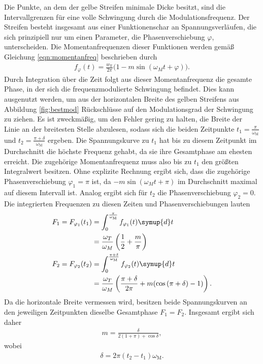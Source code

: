Die Punkte, an dem der gelbe Streifen minimale Dicke besitzt, sind die
Intervallgrenzen für eine volle Schwingung durch die Modulationsfrequenz. Der Streifen besteht insgesamt aus
einer Funktionenschar an Spannungsverläufen, die sich prinzipiell nur um einen Parameter, die Phasenverschiebung $\varphi$,
unterscheiden. Die Momentanfrequenzen dieser Funktionen werden gemäß Gleichung \eqref{eqn:momentanfreq} beschrieben durch
\begin{align}
  f_{\varphi}(t) = \frac{w_\text{T}}{2 \pi} \bigl(1 - m \sin{(\omega_M t + \varphi)}\bigr).
\end{align}
Durch Integration über die Zeit folgt aus dieser Momentanfrequenz die gesamte Phase, in der sich die frequenzmodulierte
Schwingung befindet. Dies kann ausgenutzt werden, um aus der horizontalen Breite des gelben Streifens aus Abbildung \ref{fig:bestmod}
Rückschlüsse auf den Modulationsgrad der Schwingung zu ziehen. Es ist zweckmäßig, um den Fehler gering zu halten,
die Breite der Linie an der breitesten Stelle abzulesen, sodass sich die beiden Zeitpunkte $t_1 = \frac{\pi}{\omega_\text{M}}$
und $t_2 = \frac{\pi + \delta}{\omega_\text{M}}$ ergeben. Die Spannungskurve zu $t_1$ hat bis zu diesem
Zeitpunkt im Durchschnitt die höchste Frequenz gehabt, da sie ihre Gesamtphase am ehesten erreicht. Die zugehörige Momentanfrequenz
muss also bis zu $t_1$ den größten Integralwert besitzen. Ohne explizite Rechnung ergibt sich, dass die zugehörige
Phasenverschiebung $\varphi_1 = \pi$ ist, da $-m\sin{(\omega_M t + \pi)}$ im Durchschnitt maximal auf diesem Intervall ist.
Analog ergibt sich für $t_2$ die Phasenverschiebung $\varphi_2 = 0$. Die integrierten Frequenzen zu diesen Zeiten und Phasenverschiebungen lauten
\begin{align}
  F_1 = F_{\varphi_1}(t_1) &= \int_{0}^{\frac{\pi}{\omega_\text{M}}} f_{\varphi_1}(t) \symup{d}t \\
  &= \frac{\omega_T}{\omega_M} \left( \frac12 + \frac{m}{\pi} \right) \\
  F_2 = F_{\varphi_2}(t_2) &= \int_{0}^{\frac{\pi+\delta}{\omega_\text{M}}} f_{\varphi_2}(t) \symup{d}t \\
  &= \frac{\omega_T}{\omega_M} \left( \frac{\pi + \delta}{2 \pi} + m(\cos{(\pi + \delta)} - 1) \right).
\end{align}
Da die horizontale Breite vermessen wird, besitzen beide Spannungskurven an den jeweiligen Zeitpunkten dieselbe Gesamtphase $F_1 = F_2$.
Insgesamt ergibt sich daher
\begin{align}
  m = \frac{\delta}{2(1+\pi) + \cos{\delta}},
\end{align}
wobei
\begin{align}
  \delta = 2 \pi (t_2 - t_1) \omega_\text{M}.
\end{align}
